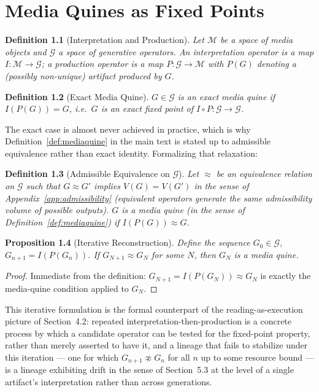\documentclass[11pt]{book}
\newtheorem{definition}{Definition}[chapter]
\newtheorem{proposition}[definition]{Proposition}
\begin{document}
\chapter{Media Quines as Fixed Points}
\label{app:fixedpoints}

\begin{definition}[Interpretation and Production]
Let $\mathcal{M}$ be a space of media objects and $\mathcal{G}$ a space of generative operators. An \emph{interpretation operator} is a map $I:\mathcal{M}\to\mathcal{G}$; a \emph{production operator} is a map $P:\mathcal{G}\to\mathcal{M}$ with $P(G)$ denoting a (possibly non-unique) artifact produced by $G$.
\end{definition}

\begin{definition}[Exact Media Quine]
$G\in\mathcal{G}$ is an \emph{exact media quine} if $I(P(G)) = G$, i.e.\ $G$ is an exact fixed point of $I\circ P:\mathcal{G}\to\mathcal{G}$.
\end{definition}

The exact case is almost never achieved in practice, which is why Definition~\ref{def:mediaquine} in the main text is stated up to admissible equivalence rather than exact identity. Formalizing that relaxation:

\begin{definition}[Admissible Equivalence on $\mathcal{G}$]
Let $\approx$ be an equivalence relation on $\mathcal{G}$ such that $G\approx G'$ implies $V(G)=V(G')$ in the sense of Appendix~\ref{app:admissibility} (equivalent operators generate the same admissibility volume of possible outputs). $G$ is a \emph{media quine} (in the sense of Definition~\ref{def:mediaquine}) if $I(P(G))\approx G$.
\end{definition}

\begin{proposition}[Iterative Reconstruction]
Define the sequence $G_0\in\mathcal{G}$, $G_{n+1} = I(P(G_n))$. If $G_{N+1}\approx G_N$ for some $N$, then $G_N$ is a media quine.
\end{proposition}
\begin{proof}
Immediate from the definition: $G_{N+1}=I(P(G_N))\approx G_N$ is exactly the media-quine condition applied to $G_N$.
\end{proof}

This iterative formulation is the formal counterpart of the reading-as-execution picture of Section~4.2: repeated interpretation-then-production is a concrete process by which a candidate operator can be tested for the fixed-point property, rather than merely asserted to have it, and a lineage that fails to stabilize under this iteration --- one for which $G_{n+1}\not\approx G_n$ for all $n$ up to some resource bound --- is a lineage exhibiting drift in the sense of Section~5.3 at the level of a single artifact's interpretation rather than across generations.
\end{document}
